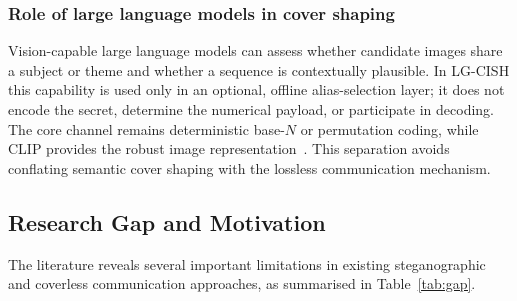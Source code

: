 \documentclass[10pt,a4paper]{article}
\theoremstyle{definition}
\begin{document}
\subsubsection{Role of large language models in cover shaping}
Vision-capable large language models can assess whether candidate images share a
subject or theme and whether a sequence is contextually plausible. In LG-CISH this
capability is used only in an optional, offline alias-selection layer; it does not
encode the secret, determine the numerical payload, or participate in decoding.
The core channel remains deterministic base-$N$ or permutation coding, while CLIP
provides the robust image representation~\cite{radford2021}. This separation avoids
conflating semantic cover shaping with the lossless communication mechanism.

\subsection{Research Gap and Motivation}\label{sec:motivation}
The literature reveals several important limitations in existing steganographic and
coverless communication approaches, as summarised in Table~\ref{tab:gap}.
\end{document}
